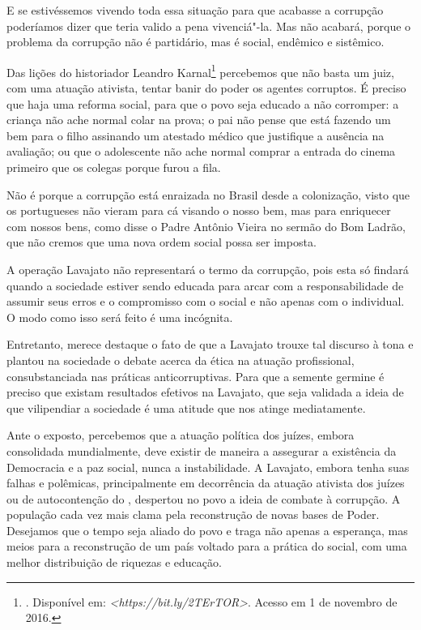 E se estivéssemos vivendo toda essa situação para que acabasse a
corrupção poderíamos dizer que teria valido a pena vivenciá"-la.
Mas não acabará, porque o problema da corrupção não é partidário,
mas é social, endêmico e sistêmico.

Das lições do historiador Leandro Karnal\footnote{. Disponível em:
  \emph{\textless{}https://bit.ly/2TErTOR\textgreater{}}.
  Acesso em 1 de novembro de 2016.} percebemos que não basta um juiz,
com uma atuação ativista, tentar banir do poder os agentes corruptos. É
preciso que haja uma reforma social, para que o povo seja educado a não
corromper: a criança não ache normal colar na prova; o pai não pense que
está fazendo um bem para o filho assinando um atestado médico que
justifique a ausência na avaliação; ou que o adolescente não ache normal
comprar a entrada do cinema primeiro que os colegas porque furou a fila.

Não é porque a corrupção está enraizada no Brasil desde a colonização,
visto que os portugueses não vieram para cá visando o nosso bem, mas
para enriquecer com nossos bens, como disse o Padre Antônio Vieira no
sermão do Bom Ladrão, que não cremos que uma nova ordem social possa ser
imposta.

A operação Lavajato não representará o termo da corrupção, pois esta só
findará quando a sociedade estiver sendo educada para arcar com a
responsabilidade de assumir seus erros e o compromisso com o social e
não apenas com o individual. O modo como isso será feito é uma
incógnita.

Entretanto, merece destaque o fato de que a Lavajato trouxe tal discurso
à tona e plantou na sociedade o debate acerca da ética na atuação
profissional, consubstanciada nas práticas anticorruptivas. Para que a
semente germine é preciso que existam resultados efetivos na Lavajato,
que seja validada a ideia de que vilipendiar a sociedade é uma atitude
que nos atinge mediatamente.

Ante o exposto, percebemos que a atuação política dos juízes, embora
consolidada mundialmente, deve existir de maneira a assegurar a
existência da Democracia e a paz social, nunca a instabilidade. A
Lavajato, embora tenha suas falhas e polêmicas, principalmente em
decorrência da atuação ativista dos juízes ou de autocontenção do ,
despertou no povo a ideia de combate à corrupção. A população cada vez
mais clama pela reconstrução de novas bases de Poder. Desejamos que o
tempo seja aliado do povo e traga não apenas a esperança, mas meios para
a reconstrução de um país voltado para a prática do social, com uma
melhor distribuição de riquezas e educação.


